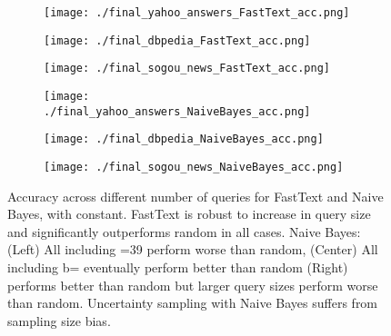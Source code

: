 \documentclass[11pt,a4paper]{article}
\begin{document}
\begin{figure*}[!th]
\begin{subfigure}[h]{0.33\linewidth}
\texttt{[image: ./final\_yahoo\_answers\_FastText\_acc.png]}
\end{subfigure}
\begin{subfigure}[h]{0.33\linewidth}
\texttt{[image: ./final\_dbpedia\_FastText\_acc.png]}
\end{subfigure}
\begin{subfigure}[h]{0.33\linewidth}
\texttt{[image: ./final\_sogou\_news\_FastText\_acc.png]}
\end{subfigure}
\begin{subfigure}[h]{0.33\linewidth}
\texttt{[image: ./final\_yahoo\_answers\_NaiveBayes\_acc.png]}
\end{subfigure}
\begin{subfigure}[h]{0.33\linewidth}
\texttt{[image: ./final\_dbpedia\_NaiveBayes\_acc.png]}
\end{subfigure}
\begin{subfigure}[h]{0.33\linewidth}
\texttt{[image: ./final\_sogou\_news\_NaiveBayes\_acc.png]}
\end{subfigure}
\caption{Accuracy across different number of queries  for FastText and Naive Bayes, with   constant. FastText is robust to increase in query size and significantly outperforms random in all cases. Naive Bayes: (Left) All including =39 perform worse than random, (Center) All including b= eventually perform better than random (Right)  performs better than random but larger query sizes perform worse than random. Uncertainty sampling with Naive Bayes suffers from sampling size bias.} 
\label{fig:sampling_biases}
\end{figure*}
\end{document}

